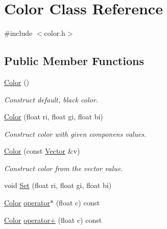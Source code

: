\hypertarget{class_color}{}\section{Color Class Reference}
\label{class_color}


{\ttfamily \#include $<$color.\+h$>$}

\subsection*{Public Member Functions}
\begin{DoxyCompactItemize}
\item 
\mbox{\label{class_color_a9a742cbe9f9f4037f5d9f4e81a9b2428}} 
\mbox{\hyperlink{class_color_a9a742cbe9f9f4037f5d9f4e81a9b2428}{Color}} ()
\begin{DoxyCompactList}\small\item\em Construct default, black color. \end{DoxyCompactList}\item 
\mbox{\label{class_color_a24e9f1b022bec1e1ace02ed2956335b5}} 
\mbox{\hyperlink{class_color_a24e9f1b022bec1e1ace02ed2956335b5}{Color}} (float ri, float gi, float bi)
\begin{DoxyCompactList}\small\item\em Construct color with given componen\textquotesingle{}s values. \end{DoxyCompactList}\item 
\mbox{\label{class_color_af41b1bebc47df170ba61176c739be64b}} 
\mbox{\hyperlink{class_color_af41b1bebc47df170ba61176c739be64b}{Color}} (const \mbox{\hyperlink{struct_vector}{Vector}} \&v)
\begin{DoxyCompactList}\small\item\em Construct color from the vector value. \end{DoxyCompactList}\item 
void \mbox{\hyperlink{class_color_abe5a97a40715b5474aca1576dcf0f3bd}{Set}} (float ri, float gi, float bi)
\item 
\mbox{\hyperlink{class_color}{Color}} \mbox{\hyperlink{class_color_ad752bd0184c61b0afd86fe11f1472633}{operator$\ast$}} (float c) const
\item 
\mbox{\hyperlink{class_color}{Color}} \mbox{\hyperlink{class_color_a7937d45e05eacfa19174171743f612c6}{operator+}} (float c) const

\end{DoxyCompactItemize}
